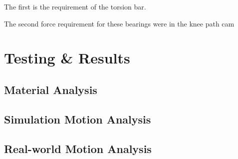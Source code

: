 The first is the requirement of the torsion bar. 

The second force requirement for these bearings were in the knee path cam

\section{Testing \& Results}

\subsection{Material Analysis}

\subsection{Simulation Motion Analysis}

\subsection{Real-world Motion Analysis}
